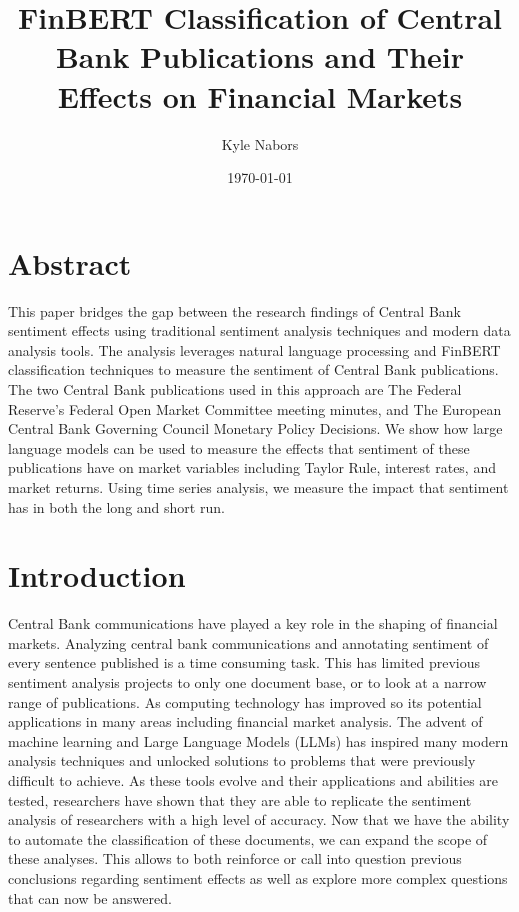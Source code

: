 \documentclass[12pt, letterpaper]{article}
\begin{document}
\title{FinBERT Classification of Central Bank Publications and Their Effects on Financial Markets}
\author{Kyle Nabors}

\date{\today}

\maketitle

\section{Abstract}
This paper bridges the gap between the research findings of Central Bank sentiment effects using traditional sentiment analysis techniques and modern data analysis tools. 
The analysis leverages natural language processing and FinBERT classification techniques to measure the sentiment of Central Bank publications. 
The two Central Bank publications used in this approach are The Federal Reserve's Federal Open Market Committee meeting minutes, and The European Central Bank Governing Council Monetary Policy Decisions. 
We show how large language models can be used to measure the effects that sentiment of these publications have on market variables including Taylor Rule, interest rates, and market returns. 
Using time series analysis, we measure the impact that sentiment has in both the long and short run. 

\section{Introduction}
Central Bank communications have played a key role in the shaping of financial markets. 
Analyzing central bank communications and annotating sentiment of every sentence published is a time consuming task. 
This has limited previous sentiment analysis projects to only one document base, or to look at a narrow range of publications. 
As computing technology has improved so its potential applications in many areas including financial market analysis. 
The advent of machine learning and  Large Language Models (LLMs) has inspired many modern analysis techniques and unlocked solutions to problems that were previously difficult to achieve. 
As these tools evolve and their applications and abilities are tested, researchers have shown that they are able to replicate the sentiment analysis of researchers with a high level of accuracy. 
Now that we have the ability to automate the classification of these documents, we can expand the scope of these analyses. 
This allows to both reinforce or call into question previous conclusions regarding sentiment effects as well as explore more complex questions that can now be answered. 
\newline
\end{document}
